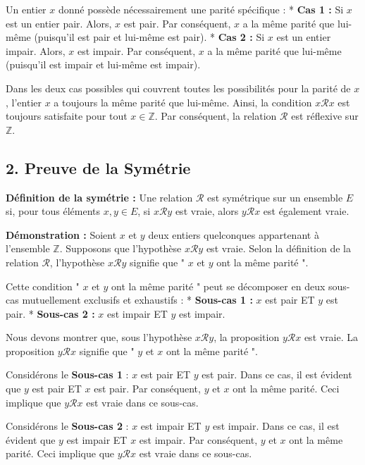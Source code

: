 \documentclass{report}
\begin{document}
Un entier $x$ donné possède nécessairement une parité spécifique :
*   \textbf{Cas 1 :} Si $x$ est un entier pair.
    Alors, $x$ est pair. Par conséquent, $x$ a la même parité que lui-même (puisqu'il est pair et lui-même est pair).
*   \textbf{Cas 2 :} Si $x$ est un entier impair.
    Alors, $x$ est impair. Par conséquent, $x$ a la même parité que lui-même (puisqu'il est impair et lui-même est impair).

Dans les deux cas possibles qui couvrent toutes les possibilités pour la parité de $x$, l'entier $x$ a toujours la même parité que lui-même.
Ainsi, la condition $x \mathcal{R} x$ est toujours satisfaite pour tout $x \in \mathbb{Z}$.
Par conséquent, la relation $\mathcal{R}$ est réflexive sur $\mathbb{Z}$.

\subsection*{2. Preuve de la Symétrie}

\textbf{Définition de la symétrie :} Une relation $\mathcal{R}$ est symétrique sur un ensemble $E$ si, pour tous éléments $x, y \in E$, si $x \mathcal{R} y$ est vraie, alors $y \mathcal{R} x$ est également vraie.

\textbf{Démonstration :}
Soient $x$ et $y$ deux entiers quelconques appartenant à l'ensemble $\mathbb{Z}$.
Supposons que l'hypothèse $x \mathcal{R} y$ est vraie.
Selon la définition de la relation $\mathcal{R}$, l'hypothèse $x \mathcal{R} y$ signifie que " $x$ et $y$ ont la même parité ".

Cette condition " $x$ et $y$ ont la même parité " peut se décomposer en deux sous-cas mutuellement exclusifs et exhaustifs :
*   \textbf{Sous-cas 1 :} $x$ est pair ET $y$ est pair.
*   \textbf{Sous-cas 2 :} $x$ est impair ET $y$ est impair.

Nous devons montrer que, sous l'hypothèse $x \mathcal{R} y$, la proposition $y \mathcal{R} x$ est vraie.
La proposition $y \mathcal{R} x$ signifie que " $y$ et $x$ ont la même parité ".

Considérons le \textbf{Sous-cas 1} : $x$ est pair ET $y$ est pair.
Dans ce cas, il est évident que $y$ est pair ET $x$ est pair. Par conséquent, $y$ et $x$ ont la même parité.
Ceci implique que $y \mathcal{R} x$ est vraie dans ce sous-cas.

Considérons le \textbf{Sous-cas 2} : $x$ est impair ET $y$ est impair.
Dans ce cas, il est évident que $y$ est impair ET $x$ est impair. Par conséquent, $y$ et $x$ ont la même parité.
Ceci implique que $y \mathcal{R} x$ est vraie dans ce sous-cas.
\end{document}
